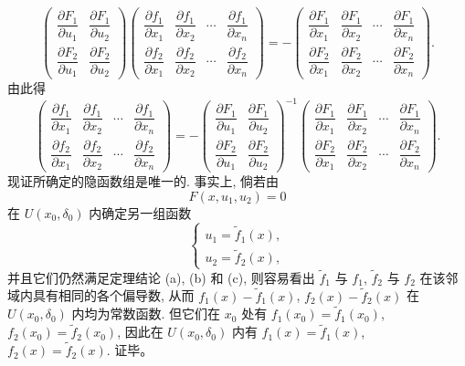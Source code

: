 \documentclass[UTF8, 12pt, fontset=fandol, oneside]{ctexart}
\begin{document}
\[
  \begin{pmatrix}
    \dfrac{\partial F_1}{\partial u_1} &
    \dfrac{\partial F_1}{\partial u_2}\\
    \dfrac{\partial F_2}{\partial u_1} &
    \dfrac{\partial F_2}{\partial u_2}
  \end{pmatrix}
  \begin{pmatrix}
    \dfrac{\partial f_1}{\partial x_1} &
    \dfrac{\partial f_1}{\partial x_2} &
    \cdots &
    \dfrac{\partial f_1}{\partial x_n}\\
    \dfrac{\partial f_2}{\partial x_1} &
    \dfrac{\partial f_2}{\partial x_2} &
    \cdots &
    \dfrac{\partial f_2}{\partial x_n}
  \end{pmatrix}
  =-
  \begin{pmatrix}
    \dfrac{\partial F_1}{\partial x_1} &
    \dfrac{\partial F_1}{\partial x_2} &
    \cdots &
    \dfrac{\partial F_1}{\partial x_n}\\
    \dfrac{\partial F_2}{\partial x_1} &
    \dfrac{\partial F_2}{\partial x_2} &
    \cdots &
    \dfrac{\partial F_2}{\partial x_n}
  \end{pmatrix}.
\]
由此得
\[
  \begin{pmatrix}
    \dfrac{\partial f_1}{\partial x_1} &
    \dfrac{\partial f_1}{\partial x_2} &
    \cdots &
    \dfrac{\partial f_1}{\partial x_n}\\
    \dfrac{\partial f_2}{\partial x_1} &
    \dfrac{\partial f_2}{\partial x_2} &
    \cdots &
    \dfrac{\partial f_2}{\partial x_n}
  \end{pmatrix}
  =-
  \begin{pmatrix}
    \dfrac{\partial F_1}{\partial u_1} &
    \dfrac{\partial F_1}{\partial u_2}\\
    \dfrac{\partial F_2}{\partial u_1} &
    \dfrac{\partial F_2}{\partial u_2}
  \end{pmatrix}^{-1}
  \begin{pmatrix}
    \dfrac{\partial F_1}{\partial x_1} &
    \dfrac{\partial F_1}{\partial x_2} &
    \cdots &
    \dfrac{\partial F_1}{\partial x_n}\\
    \dfrac{\partial F_2}{\partial x_1} &
    \dfrac{\partial F_2}{\partial x_2} &
    \cdots &
    \dfrac{\partial F_2}{\partial x_n}
  \end{pmatrix}.
\]
现证所确定的隐函数组是唯一的. 事实上, 倘若由
\[
  F(x,u_1,u_2)=0
\]
在 $U(x_0,\delta_0)$ 内确定另一组函数
\[
  \begin{cases}
    u_1=\tilde f_1(x),\\
    u_2=\tilde f_2(x),
  \end{cases}
\]
并且它们仍然满足定理结论 (a), (b) 和 (c), 则容易看出 $\tilde f_1$ 与 $f_1$, $\tilde f_2$ 与 $f_2$ 在该邻域内具有相同的各个偏导数, 从而 $f_1(x)-\tilde f_1(x)$, $f_2(x)-\tilde f_2(x)$ 在 $U(x_0,\delta_0)$ 内均为常数函数. 但它们在 $x_0$ 处有 $f_1(x_0)=\tilde f_1(x_0)$, $f_2(x_0)=\tilde f_2(x_0)$, 因此在 $U(x_0,\delta_0)$ 内有 $f_1(x)=\tilde f_1(x)$, $f_2(x)=\tilde f_2(x)$. 证毕。
\end{document}

